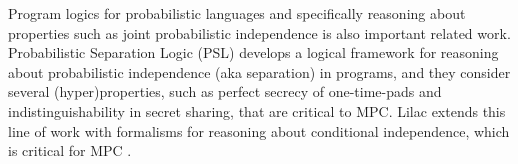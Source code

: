 Program logics for probabilistic languages and specifically reasoning
about properties such as joint probabilistic independence is also
important related work. Probabilistic Separation Logic (PSL)
\cite{barthe2019probabilistic} develops a logical framework for
reasoning about probabilistic independence (aka separation) in
programs, and they consider several (hyper)properties, such as perfect
secrecy of one-time-pads and indistinguishability in secret sharing,
that are critical to MPC. Lilac \cite{li2023lilac} extends this line
of work with formalisms for reasoning about conditional independence,
which is critical for MPC \cite{skalka-near-ppdp24}.

